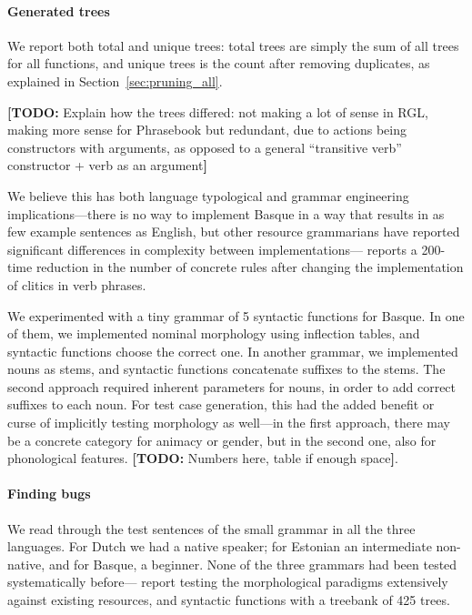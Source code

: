\documentclass[11pt]{article}
\newcommand{\todo}[1]{{\color{cyan}\textbf{[TODO: }#1\textbf{]}}}
\begin{document}
\paragraph{Generated trees}

We report both total and unique trees: total trees are simply the sum
of all trees for all functions, and unique trees is the count after
removing duplicates, as explained in Section~\ref{sec:pruning_all}.

\todo{Explain how the trees differed: not making a lot of sense in
  RGL, making more sense for Phrasebook but redundant, due to actions
  being constructors with arguments, as opposed to a general
  ``transitive verb'' constructor + verb as an argument}

We believe this has both language typological and grammar engineering
implications---there is no way to implement Basque in a way that
results in as few example sentences as English, but other resource
grammarians have reported significant differences in complexity
between implementations---\cite{enache2010} reports a
200-time reduction in the number of concrete rules after changing the
implementation of clitics in verb phrases.

We experimented with a tiny grammar of 5 syntactic functions for
Basque. In one of them, we implemented nominal morphology using
inflection tables, and syntactic functions choose the correct one.
In another grammar, we implemented nouns as stems, and syntactic
functions concatenate suffixes to the stems. The second approach
required inherent parameters for nouns, in order to add correct
suffixes to each noun. For test case generation, this had the added
benefit or curse of implicitly testing morphology as well---in the first
approach, there may be a concrete category for animacy or gender, but
in the second one, also for phonological features. \todo{Numbers here,
  table if enough space}.


\paragraph{Finding bugs} 
We read through the test sentences of the small grammar in all the
three languages. 
For Dutch we had a native speaker; for Estonian an intermediate non-native,
and for Basque, a beginner. None of the three grammars had been tested
systematically before---\cite{listenmaa_kaljurand2014} report testing
the morphological paradigms extensively against existing resources,
and syntactic functions with a treebank of 425 trees.
\end{document}

